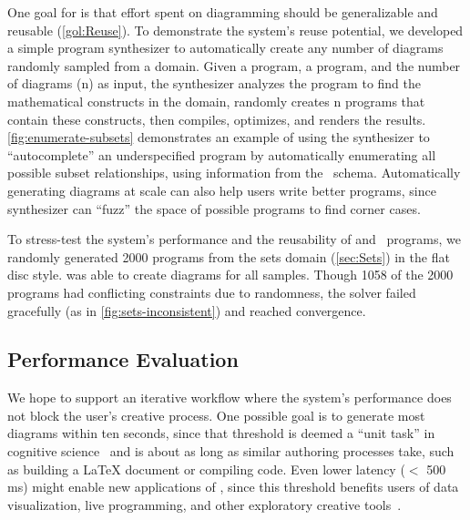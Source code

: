 One goal for \Penrose{} is that effort spent on diagramming should be generalizable and reusable (\ref{gol:Reuse}). To demonstrate the system's reuse potential, we developed a simple program synthesizer to automatically create any number of diagrams randomly sampled from a domain. Given a \Domain{} program, a \Style{} program, and the number of diagrams (\textsf{n}) as input, the synthesizer analyzes the \Domain{} program to find the mathematical constructs in the domain, randomly creates \textsf{n} \Substance{} programs that contain these constructs, then compiles, optimizes, and renders the results. \cref{fig:enumerate-subsets} demonstrates an example of using the synthesizer to ``autocomplete'' an underspecified \Substance{} program by automatically enumerating all possible subset relationships, using information from the \Domain\ schema. Automatically generating diagrams at scale can also help users write better \Style{} programs, since synthesizer can ``fuzz'' the space of possible \Substance{} programs to find corner cases.

To stress-test the system's performance and the reusability of \Style{} and \Domain{}\ programs, we randomly generated 2000 \Substance{} programs from the sets domain (\cref{sec:Sets}) in the flat disc style. \Penrose{} was able to create diagrams for all samples. Though 1058 of the 2000 programs had conflicting constraints due to randomness, the solver failed gracefully (as in \cref{fig:sets-inconsistent}) and reached convergence.

\subsection{Performance Evaluation}
\label{sec:PerformanceEvaluation}

We hope to support an iterative workflow where the system's performance does not block the user's creative process. One possible goal is to generate most diagrams within ten seconds, since that threshold is deemed a ``unit task'' in cognitive science~\cite{unifiedTheoriesCognition} and is about as long as similar authoring processes take, such as building a \LaTeX{} document or compiling code. Even lower latency ($<$ 500 ms) might enable new applications of \Penrose, since this threshold benefits users of data visualization, live programming, and other exploratory creative tools~\cite{Liu:latency:2014}.

